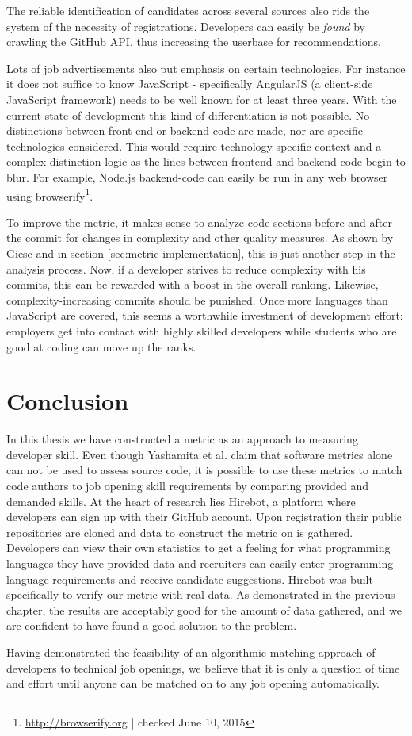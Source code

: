 The reliable identification of candidates across several sources also rids the system of the necessity of registrations. Developers can easily be \textit{found} by crawling the GitHub API, thus increasing the userbase for recommendations.


Lots of job advertisements also put emphasis on certain technologies. For instance it does not suffice to know JavaScript - specifically AngularJS (a client-side JavaScript framework) needs to be well known for at least three years. With the current state of development this kind of differentiation is not possible. No distinctions between front-end or backend code are made, nor are specific technologies considered. This would require technology-specific context and a complex distinction logic as the lines between frontend and backend code begin to blur. For example, Node.js backend-code can easily be run in any web browser using browserify\footnote{\url{http://browserify.org} | checked June 10, 2015}.
\newline

To improve the metric, it makes sense to analyze code sections before and after the commit for changes in complexity and other quality measures. As shown by Giese \cite{pg:2014} and in section \ref{sec:metric-implementation}, this is just another step in the analysis process. Now, if a developer strives to reduce complexity with his commits, this can be rewarded with a boost in the overall ranking. Likewise, complexity-increasing commits should be punished. Once more languages than JavaScript are covered, this seems a worthwhile investment of development effort: employers get into contact with highly skilled developers while students who are good at coding can move up the ranks.

\section{Conclusion}
In this thesis we have constructed a metric as an approach to measuring developer skill. Even though Yashamita et al. claim that software metrics alone can not be used to assess source code\cite{mlya:2012}, it is possible to use these metrics to match code authors to job opening skill requirements by comparing provided and demanded skills. At the heart of research lies Hirebot, a platform where developers can sign up with their GitHub account. Upon registration their public repositories are cloned and data to construct the metric on is gathered. Developers can view their own statistics to get a feeling for what programming languages they have provided data and recruiters can easily enter programming language requirements and receive candidate suggestions. Hirebot was built specifically to verify our metric with real data. As demonstrated in the previous chapter, the results are acceptably good for the amount of data gathered, and we are confident to have found a good solution to the problem.

Having demonstrated the feasibility of an algorithmic matching approach of developers to technical job openings, we believe that it is only a question of time and effort until anyone can be matched on to any job opening automatically.

